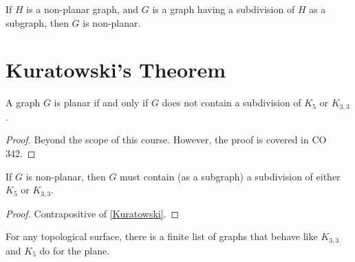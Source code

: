 \begin{thmbox}
    \begin{corollary}
        If $ H $ is a non-planar graph, and $ G $ is a graph
        having a subdivision of $ H $ as a subgraph, then $ G $
        is non-planar.
    \end{corollary}
\end{thmbox}

\section{Kuratowski's Theorem}
\begin{thmbox}
    \begin{theorem}
        A graph $ G $ is planar if and only if $ G $ does not
        contain a subdivision of $ K_5 $ or $ K_{3,3} $.
    \end{theorem}
\end{thmbox}
\begin{proof}
    Beyond the scope of this course. However, the proof is covered in
    CO 342.
\end{proof}

\begin{thmbox}
    \begin{corollary}
        If $ G $ is non-planar, then $ G $ must contain
        (as a subgraph) a subdivision of either $ K_5 $ or $ K_{3,3} $.
    \end{corollary}
\end{thmbox}
\begin{proof}
    Contrapositive of \ref{Kuratowski}.
\end{proof}

\begin{thmbox}
    \begin{theorem}
        For any topological surface, there is a finite list of graphs that behave
        like $ K_{3,3} $ and $ K_5 $ do for the plane.
    \end{theorem}
\end{thmbox}
